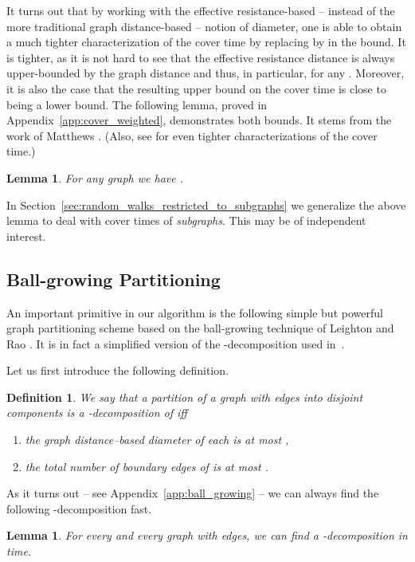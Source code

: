\documentclass[11pt, letterpaper]{article}
\newtheorem{lemma}[theorem]{Lemma}
\newtheorem{definition}[theorem]{Definition}
\begin{document}
It turns out that by working with the effective resistance-based -- instead of the more traditional graph distance-based -- notion of diameter, one is able to obtain a much tighter characterization of the cover time by replacing  by  in the bound. It is tighter, as it is not hard to see that the effective resistance distance is always upper-bounded by the graph distance and thus, in particular,  for any . Moreover, it is also the case that the resulting upper bound on the cover time is close to being a lower bound. The following lemma, proved in Appendix~\ref{app:cover_weighted}, demonstrates both bounds. It stems from the work of Matthews \cite{Matthews88}. (Also, see \cite{KahnKLV00,DingLP12} for even tighter characterizations of the cover time.) 

\begin{lemma}\label{lem:cover_weighted}
For any graph  we have .
\end{lemma}

In Section~\ref{sec:random_walks_restricted_to_subgraphs} we generalize the above lemma to deal with cover times of {\em subgraphs}. This may be of independent interest.

\subsection{Ball-growing Partitioning} \label{sec:ball_growing}

An important primitive in our algorithm is the following simple but powerful graph partitioning scheme based on the ball-growing technique of Leighton and Rao \cite{LeightonR99}. It is in fact a simplified version of the -decomposition used in~\cite{KelnerM09}.

Let us first introduce the following definition.
\begin{definition}\label{def:ball_decomp}
We say that a partition of a graph  with  edges into disjoint components  is a -decomposition of  iff
\vspace{-7pt}
\begin{enumerate}[(1)]\addtolength{\itemsep}{-.5\baselineskip}
\item the graph distance--based diameter  of each  is at most ,
\item the total number of boundary edges of  is at most .
\end{enumerate}
\end{definition}
As it turns out -- see Appendix~\ref{app:ball_growing} -- we can always find the following -decomposition fast.
\begin{lemma}\label{lem:ball_growing}
For every  and every graph  with  edges, we can find a -decomposition in  time.
\end{lemma}
\end{document}
